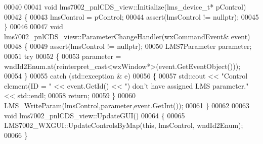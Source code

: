 \begin{DoxyCode}
00040 
00041 \textcolor{keywordtype}{void} lms7002_pnlCDS_view::Initialize(lms_device_t* pControl)
00042 \{
00043     lmsControl = pControl;
00044     assert(lmsControl != \textcolor{keyword}{nullptr});
00045 \}
00046 
00047 \textcolor{keywordtype}{void} lms7002_pnlCDS_view::ParameterChangeHandler(wxCommandEvent& event)
00048 \{
00049     assert(lmsControl != \textcolor{keyword}{nullptr});
00050     LMS7Parameter parameter;
00051     \textcolor{keywordflow}{try}
00052     \{
00053         parameter = wndId2Enum.at(reinterpret\_cast<wxWindow*>(event.GetEventObject()));
00054     \}
00055     \textcolor{keywordflow}{catch} (std::exception & e)
00056     \{
00057         std::cout << \textcolor{stringliteral}{"Control element(ID = "} << \textcolor{keyword}{event}.GetId() << \textcolor{stringliteral}{") don't have assigned LMS parameter."} << 
      std::endl;
00058         \textcolor{keywordflow}{return};
00059     \}
00060     LMS_WriteParam(lmsControl,parameter,event.GetInt());
00061 \}
00062 
00063 \textcolor{keywordtype}{void} lms7002_pnlCDS_view::UpdateGUI()
00064 \{
00065     LMS7002_WXGUI::UpdateControlsByMap(\textcolor{keyword}{this}, lmsControl, wndId2Enum);
00066 \}
\end{DoxyCode}
